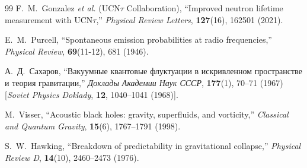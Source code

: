 \documentclass[12pt,a4paper]{article}
\begin{document}
\begin{thebibliography}{99}
			F.~M.~Gonzalez \textit{et al.} (UCN$\tau$ Collaboration), 
			``Improved neutron lifetime measurement with UCN$\tau$,''
			\textit{Physical Review Letters}, \textbf{127}(16), 162501 (2021).
			
			E.~M.~Purcell, 
			``Spontaneous emission probabilities at radio frequencies,''
			\textit{Physical Review}, \textbf{69}(11-12), 681 (1946).
			
			А.~Д.~Сахаров, 
			``Вакуумные квантовые флуктуации в искривленном пространстве и теория гравитации,''
			\textit{Доклады Академии Наук СССР}, \textbf{177}(1), 70--71 (1967) 
			[\textit{Soviet Physics Doklady}, \textbf{12}, 1040--1041 (1968)].
			
			M.~Visser, 
			``Acoustic black holes: gravity, superfluids, and vorticity,''
			\textit{Classical and Quantum Gravity}, \textbf{15}(6), 1767--1791 (1998).
			
			S.~W.~Hawking, 
			``Breakdown of predictability in gravitational collapse,''
			\textit{Physical Review D}, \textbf{14}(10), 2460--2473 (1976).
			
		\end{thebibliography}
		
	
\end{document}
